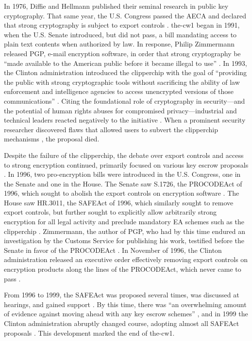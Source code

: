 In 1976, Diffie and Hellmann published their seminal research in public key cryptography. That same year, the U.S.
Congress passed the \ac{AECA} and declared that strong cryptography is subject to export controls
\cite{kehl_right_2015}. \Ac{the-cw1} began in 1991, when the U.S. Senate introduced, but did not pass, a bill mandating
access to plain text contents when authorized by law. In response, Philip Zimmermann released \ac{PGP}, e-mail
encryption software, in order that strong cryptography be ``made available to the American public before it became
illegal to use'' \cite{zimmermann_1996}. In 1993, the Clinton administration introduced the \ac{clipperchip}
\cite{press_1993} with the goal of ``providing the public with strong cryptographic tools without sacrificing the
ability of law enforcement and intelligence agencies to access unencrypted versions of those communications''
\cite{thompson_2015}. Citing the foundational role of cryptography in security---and the potential of human rights
abuses for compromised privacy---industrial and technical leaders reacted negatively to the initiative
\cite{kehl_right_2015} \cite{zimmermann_1996}. When a prominent security researcher discovered flaws that allowed users
to subvert the \ac{clipperchip} mechanisms \cite{blaze_protocol_1994}, the proposal died.

Despite the failure of the \ac{clipperchip}, the debate over export controls and access to strong encryption continued,
primarily focused on various key escrow proposals \cite{thompson_2015}. In 1996, two pro-encryption bills were
introduced in the U.S. Congress, one in the Senate and one in the House. The Senate saw S.1726, the \ac{PROCODEAct} of
1996, which sought to abolish the export controls on encryption software \cite{burns_s1726_1996}. The House saw HR.3011,
the \ac{SAFEAct} of 1996, which similarly sought to remove export controls, but further sought to explicitly allow
arbitrarily strong encryption for all legal activity and preclude mandatory \ac{EA} schemes such as the \ac{clipperchip}
\cite{goodlatte_hr3011_1996}. Zimmermann, the author of PGP, who had by this time endured an investigation by the
Customs Service for publishing his work, testified before the Senate in favor of the \ac{PROCODEAct}
\cite{zimmermann_1996}. In November of 1996, the Clinton administration released an executive order effectively removing
export controls on encryption products along the lines of the \ac{PROCODEAct}, which never came to pass
\cite{clinton_1996}.

From 1996 to 1999, the \ac{SAFEAct} was proposed several times, was discussed at hearings, and gained support
\cite{kehl_right_2015}. By this time, there was ``an overwhelming amount of evidence against moving ahead with any key
escrow schemes'' \cite{thompson_2015}, and in 1999 the Clinton administration abruptly changed course, adopting almost
all \ac{SAFEAct} proposals \cite{kehl_right_2015}. This development marked the end of \ac{the-cw1}.

